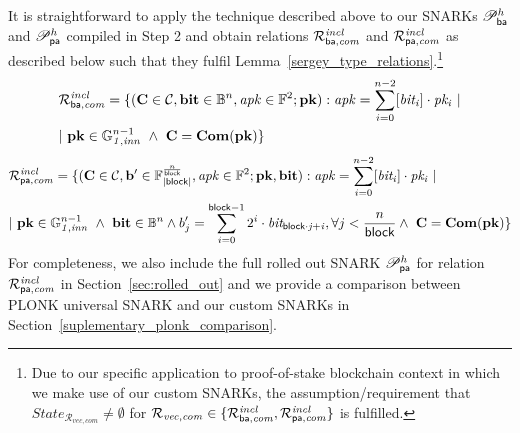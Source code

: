 \noindent It is straightforward to apply the technique described above to our SNARKs $\mathscr{P}_{\mathsf{ba}}^{h}$ and $\mathscr{P}_{\mathsf{pa}}^{h}$ 
compiled in Step 2 and obtain relations $\mathcal{R}^{\mathit{incl}}_{\mathsf{ba},\mathit{com}}$ and $\mathcal{R}^{\mathit{incl}}_{\mathsf{pa},\mathit{com}}$ as described below such that they fulfil Lemma~\ref{sergey_type_relations}.\footnote{Due to our specific application to proof-of-stake blockchain context in which we make use of our custom SNARKs, 
the assumption/requirement that  $\mathit{State}_{\mathcal{R}_{\mathit{vec}, \mathit{com}}} \neq \emptyset$ for 
$\mathcal{R}_{\mathit{vec}, \mathit{com}} \in \{\mathcal{R}^{\mathit{incl}}_{\mathsf{ba},\mathit{com}}, \mathcal{R}^{\mathit{incl}}_{\mathsf{pa},\mathit{com}} \}$ is fulfilled.}
\begin{align*}
& {\mathcal{R}^{\mathit{incl}}_{\mathsf{ba},\mathit{com}}} = \{(\mathbf{C} \in \mathcal{C}, \mathbf{bit} \in \mathbb{B}^n, \mathit{apk} \in \mathbb{F}^2; \mathbf{pk}) : 
\mathit{apk} = \sum_{i=0}^{n-2} [\mathit{bit_i}] \cdot \mathit{pk_i} \ | \\ & | \ \mathbf{pk} \in \mathbb{G}_{\mathit{1,inn}}^{n-1} \ \wedge \  \mathbf{C} = \mathbf{Com}(\mathbf{pk}) \} 
\end{align*}
\begin{align*}
& {\mathcal{R}^{\mathit{incl}}_{\mathsf{pa},\mathit{com}}}  = \{(\mathbf{C} \in \mathcal{C}, \mathbf{b'} \in \mathbb{F}_{|\mathsf{block}|}^{\frac{n}{\mathsf{block}}}, \mathit{apk} \in \mathbb{F}^2;\mathbf{pk}, \mathbf{bit}) : 
\mathit{apk} = \sum_{i=0}^{n-2} [\mathit{bit_i}] \cdot \mathit{pk_i} \ | \\ & | \ \mathbf{pk} \in \mathbb{G}_{\mathit{1,inn}}^{n-1} \ \wedge \ \mathbf{bit} \in \mathbb{B}^n  \wedge b'_{j} = \sum_{i=0}^{\mathsf{block} -1}2^i \cdot \mathit{bit_{\mathsf{block} \cdot j + i}}, \forall j < \frac{n}{\mathsf{block}}  \wedge \  \mathbf{C} = \mathbf{Com}(\mathbf{pk}) \} 
\end{align*}
For completeness, we also include the full rolled out SNARK $\mathscr{P}_{\mathsf{pa}}^{h}$ for relation $\mathcal{R}^{\mathit{incl}}_{\mathsf{pa},\mathit{com}}$ in Section~\ref{sec:rolled_out} and we provide a comparison between PLONK universal 
SNARK and our custom SNARKs in Section~\ref{suplementary_plonk_comparison}.  
